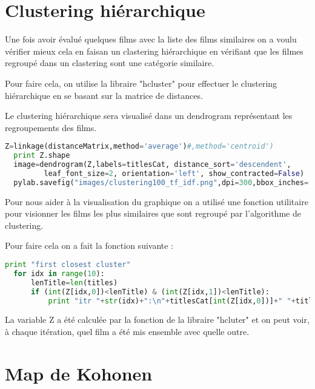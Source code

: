 \section{Clustering hiérarchique}

Une fois avoir évalué quelques films avec la liste des films similaires on a voulu vérifier mieux cela en faisan un clastering hiérarchique en vérifiant que les filmes regroupé dans un clastering sont une catégorie similaire.

Pour faire cela, on utilise la libraire "hcluster" pour effectuer le clustering hiérarchique en se basant sur la matrice de distances.

Le clustering hiérarchique sera visualisé dans un dendrogram représentant les regroupements des films. \\

\begin{lstlisting}[language=python]
  Z=linkage(distanceMatrix,method='average')#,method='centroid')
  print Z.shape
  image=dendrogram(Z,labels=titlesCat, distance_sort='descendent',
         leaf_font_size=2, orientation='left', show_contracted=False)
  pylab.savefig("images/clustering100_tf_idf.png",dpi=300,bbox_inches='tight')	 	  
\end{lstlisting}

Pour nous aider à la visualisation du graphique on a utilisé une fonction utilitaire pour visionner les films les plus similaires que sont regroupé par l'algorithme de clustering.

Pour faire cela on a fait la fonction suivante : \\

\begin{lstlisting}[language=python]
  print "first closest cluster"
  for idx in range(10):
      lenTitle=len(titles)
      if (int(Z[idx,0])<lenTitle) & (int(Z[idx,1])<lenTitle):
          print "itr "+str(idx)+":\n"+titlesCat[int(Z[idx,0])]+" "+titlesCat[int(Z[idx,1])]
\end{lstlisting}

La variable Z a été calculée par la fonction de la libraire "hcluter" et on peut voir, à chaque itération, quel film a été mis ensemble avec quelle outre.	


\section{Map de Kohonen}

